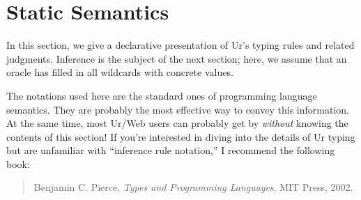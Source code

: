 \documentclass{article}
\begin{document}
\section{Static Semantics}

In this section, we give a declarative presentation of Ur's typing rules and related judgments.  Inference is the subject of the next section; here, we assume that an oracle has filled in all wildcards with concrete values.

The notations used here are the standard ones of programming language semantics.  They are probably the most effective way to convey this information.  At the same time, most Ur/Web users can probably get by \emph{without} knowing the contents of this section!  If you're interested in diving into the details of Ur typing but are unfamiliar with ``inference rule notation,'' I recommend the following book:
\begin{quote}
  Benjamin C. Pierce, \emph{Types and Programming Languages}, MIT Press, 2002.
\end{quote}
\end{document}
